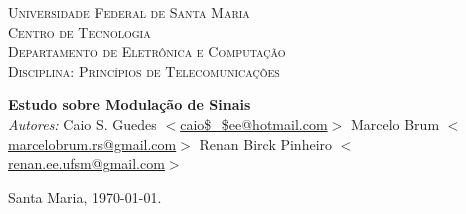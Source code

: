 \begin{titlepage}
\begin{center}

\textsc{\LARGE Universidade Federal de Santa Maria}\\[1.5cm]
\textsc{\Large Centro de Tecnologia}\\[0.5cm]
\textsc{\Large Departamento de Eletrônica e Computação}\\[0.5cm]
\textsc{\Large Disciplina: Princípios de Telecomunicações}\\[0.5cm]
\setlength{\oddsidemargin}{0pt} %
\setlength{\evensidemargin}{0pt} %
\setlength{\textwidth}{15cm}
\end{center}

\vspace*{5cm}
\begin{center}
{\huge \bfseries Estudo sobre Modulação de Sinais}\\[0.4cm]
\vspace*{130px}
\emph{Autores:}
Caio S. Guedes $<$\url{caio$_$ee@hotmail.com}$>$
Marcelo Brum $<$\url{marcelobrum.rs@gmail.com}$>$
Renan Birck Pinheiro $<$\url{renan.ee.ufsm@gmail.com}$>$


Santa Maria, \today.

\end{center}




\end{titlepage}